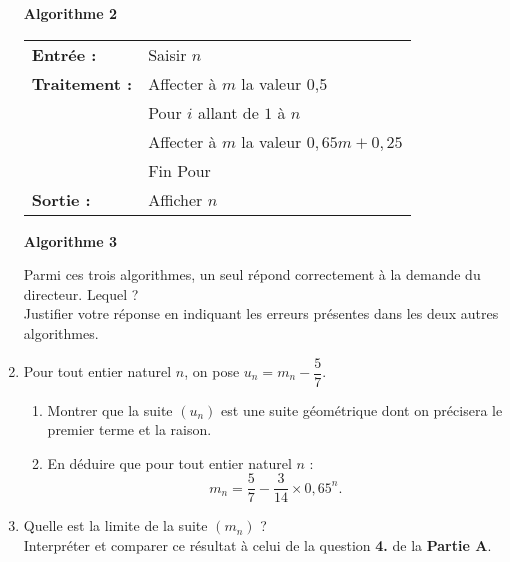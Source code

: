 \begin{enumerate}
\begin{center}
\begin{extern}
          \end{extern}
          \par
          \textbf{Algorithme 2}
     \end{center}
     \begin{center}
          \begin{extern}%
               \begin{tabular}{|l l|}\hline
                    \textbf{Entrée :}	& 	Saisir $n$\\
                    \textbf{Traitement :} & Affecter à $m$ la valeur 0,5\\
                    & Pour $i$ allant de $1$ à $n$\\
                    &\qquad Affecter à $m$ la valeur $0,65m + 0,25$ \\
                    &Fin Pour\\
                    \textbf{Sortie :}		&Afficher $n$ \\ \hline
               \end{tabular}
          \end{extern}
          \par
          \textbf{Algorithme 3}
     \end{center}
     \par
     Parmi ces trois algorithmes, un seul répond correctement à la demande du directeur. Lequel ?\\
     Justifier votre réponse en indiquant les erreurs présentes dans les deux autres algorithmes.
     \item %
     Pour tout entier naturel $n$, on pose $u_n=m_n-\dfrac{5}{7}$.
     \par
     \begin{enumerate}[label=\alph*.]
          \item %
          Montrer que la suite $(u_n)$ est une suite géométrique dont on précisera le premier terme et la raison.
          \item %
          En déduire que pour tout entier naturel $n$ :
          \[ m_n=\dfrac{5}{7}-\dfrac{3}{14} \times 0,65^n. \]
     \end{enumerate}
     \item %
     Quelle est la limite de la suite $(m_n)$ ? \\
     Interpréter et comparer ce résultat à celui de la question \textbf{4.} de la \textbf{Partie A}.
     \par
\end{enumerate}
